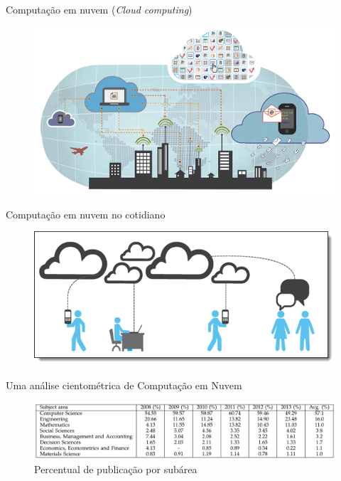 \begin{frame}{Computação em nuvem (\textit{Cloud computing})}
	\begin{figure}[htb]
		\centering
		\includegraphics[scale=0.8]{images/cloud-computing-business.png}	
	\end{figure}
\end{frame}

\begin{frame}{Computação em nuvem no cotidiano}
	\begin{figure}[htb]
		\centering
		\includegraphics[scale=0.5]{images/cloud-on-life.png}	
	\end{figure}
\end{frame}

\begin{frame}{Uma análise cientométrica de Computação em Nuvem}
	\begin{figure}[htb]
		\centering
		\caption{Percentual de publicação por subárea \cite{Heilig2014}}
		\includegraphics[scale=0.43]{images/sub-area.png}			
	\end{figure}
\end{frame}

